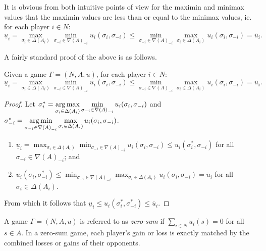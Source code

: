 	It is obvious from both intuitive points of view for the maximin and minimax values that the maximin values are less than or equal to the minimax values, ie. for each player $i \in N$:
	\[\underline{u}_i = \max_{\sigma_i \in \Delta(A_i)}\min_{\sigma_{-i} \in {\nabla(A)}_{-i}} u_i(\sigma_i, \sigma_{-i}) \leq \min_{\sigma_{-i} \in {\nabla(A)}_{-i}}\max_{\sigma_i \in \Delta(A_i)} u_i(\sigma_i, \sigma_{-i}) = \overline{u}_i.\]
	
	A fairly standard proof of the above is as follows.
	
	\begin{proposition}
		Given a game $\Gamma = (N, A, u)$, for each player $i \in N$:
		\[\underline{u}_i = \max_{\sigma_i \in \Delta(A_i)}\min_{\sigma_{-i} \in {\nabla(A)}_{-i}} u_i(\sigma_i, \sigma_{-i}) \leq \min_{\sigma_{-i} \in {\nabla(A)}_{-i}}\max_{\sigma_i \in \Delta(A_i)} u_i(\sigma_i, \sigma_{-i}) = \overline{u}_i.\]
		
		\begin{proof}
			Let $\sigma^*_i = \displaystyle\operatorname*{arg\,max}_{\sigma_i \in \Delta(A_i)}\min_{\sigma_{-i} \in {\nabla(A)}_{-i}} u_i(\sigma_i, \sigma_{-i})$ and $\sigma^*_{-i} = \displaystyle\operatorname*{arg\,min}_{\sigma_{-i} \in {\nabla(A)}_{-i}}\max_{\sigma_i \in \Delta(A_i)} u_i(\sigma_i, \sigma_{-i})$.
			
			\begin{enumerate}
				\item $\underline{u}_i = \displaystyle\max_{\sigma_i \in \Delta(A_i)}\min_{\sigma_{-i} \in {\nabla(A)}_{-i}} u_i(\sigma_i, \sigma_{-i}) \leq u_i(\sigma^*_i, \sigma_{-i})$ for all $\sigma_{-i} \in {\nabla(A)}_{-i}$; and
				\item $u_i(\sigma_i, \sigma^*_{-i}) \leq \displaystyle\min_{\sigma_{-i} \in {\nabla(A)}_{-i}}\max_{\sigma_i \in \Delta(A_i)} u_i(\sigma_i, \sigma_{-i}) = \overline{u}_i$ for all $\sigma_i \in \Delta(A_i)$.
			\end{enumerate}
			
			From which it follows that $\underline{u}_i \leq u_i(\sigma^*_i, \sigma^*_{-i}) \leq \overline{u}_i$.
		\end{proof}
	\end{proposition}
	
	A game $\Gamma = (N, A, u)$ is referred to as \textit{zero-sum} if $\sum_{i \in N} u_i(s) = 0$ for all $s \in A$. In a zero-sum game, each player's gain or loss is exactly matched by the combined losses or gains of their opponents. 
	
